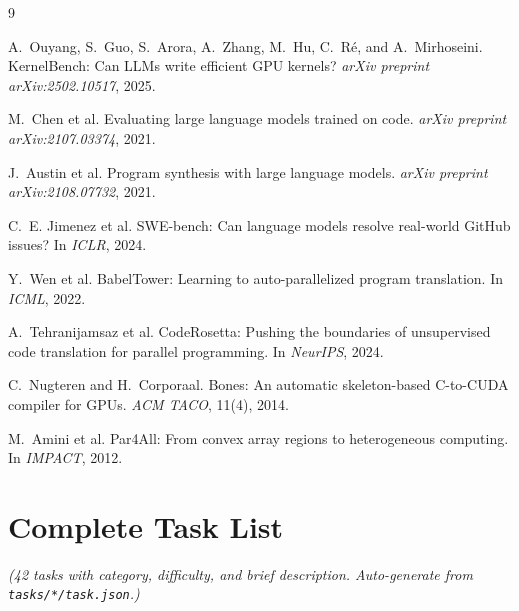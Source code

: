 \documentclass{article}
\begin{document}
\begin{thebibliography}{9}

A.~Ouyang, S.~Guo, S.~Arora, A.~Zhang, M.~Hu, C.~R\'e, and
A.~Mirhoseini.
\newblock KernelBench: Can LLMs write efficient GPU kernels?
\newblock \emph{arXiv preprint arXiv:2502.10517}, 2025.

M.~Chen et al.
\newblock Evaluating large language models trained on code.
\newblock \emph{arXiv preprint arXiv:2107.03374}, 2021.

J.~Austin et al.
\newblock Program synthesis with large language models.
\newblock \emph{arXiv preprint arXiv:2108.07732}, 2021.

C.~E. Jimenez et al.
\newblock SWE-bench: Can language models resolve real-world GitHub
issues?
\newblock In \emph{ICLR}, 2024.

Y.~Wen et al.
\newblock BabelTower: Learning to auto-parallelized program
translation.
\newblock In \emph{ICML}, 2022.

A.~Tehranijamsaz et al.
\newblock CodeRosetta: Pushing the boundaries of unsupervised code
translation for parallel programming.
\newblock In \emph{NeurIPS}, 2024.

C.~Nugteren and H.~Corporaal.
\newblock Bones: An automatic skeleton-based C-to-CUDA compiler for
GPUs.
\newblock \emph{ACM TACO}, 11(4), 2014.

M.~Amini et al.
\newblock Par4All: From convex array regions to heterogeneous
computing.
\newblock In \emph{IMPACT}, 2012.

\end{thebibliography}

\appendix

\section{Complete Task List}
\label{app:tasklist}

\emph{(42 tasks with category, difficulty, and brief description.
Auto-generate from \texttt{tasks/*/task.json}.)}

\end{document}
